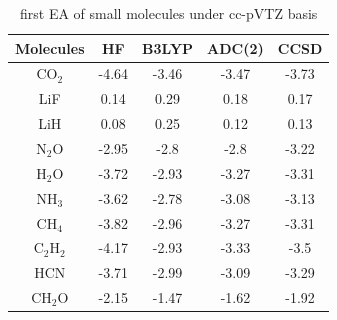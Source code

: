 \begin{table}
	\centering
	\caption{first EA of small molecules under cc-pVTZ basis}
	\label{firstEA}
\begin{tabular}{|c|c|c|c|c|}
	\hline
	Molecules              & HF    & B3LYP & ADC(2) & CCSD  \\ \hline
	$\text{CO}_2$          & -4.64 & -3.46 & -3.47  & -3.73 \\ \hline
	LiF                    & 0.14  & 0.29  & 0.18   & 0.17  \\ \hline
	LiH                    & 0.08  & 0.25  & 0.12   & 0.13  \\ \hline
	$\text{N}_2\text{O}$   & -2.95 & -2.8  & -2.8   & -3.22 \\ \hline
	$\text{H}_2\text{O}$   & -3.72 & -2.93 & -3.27  & -3.31 \\ \hline
	$\text{NH}_3$          & -3.62 & -2.78 & -3.08  & -3.13 \\ \hline
	$\text{CH}_4$          & -3.82 & -2.96 & -3.27  & -3.31 \\ \hline
	$\text{C}_2\text{H}_2$ & -4.17 & -2.93 & -3.33  & -3.5  \\ \hline
	HCN                    & -3.71 & -2.99 & -3.09  & -3.29 \\ \hline
	$\text{CH}_2\text{O}$  & -2.15 & -1.47 & -1.62  & -1.92 \\ \hline
\end{tabular}
\end{table}
